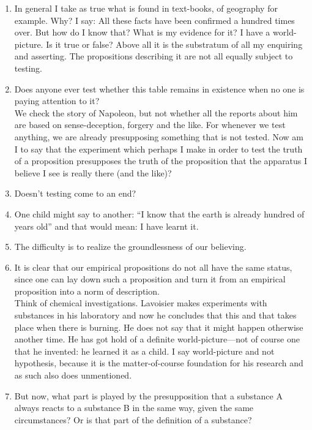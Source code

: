 \documentclass{book}
\begin{document}
\begin{enumerate}
\item
In general I take as true what is found in text-books, of geography for
example. Why? I say: All these facts have been confirmed a hundred times over.
But how do I know that? What is my evidence for it? I have a world-picture. Is
it true or false? Above all it is the substratum of all my enquiring and
asserting. The propositions describing it are not all equally subject to
testing.

\item
Does anyone ever test whether this table remains in existence when no one is
paying attention to it? \\
We check the story of Napoleon, but not whether all the reports about him are
based on sense-deception, forgery and the like. For whenever we test anything,
we are already presupposing something that is not tested. Now am I to say that
the experiment which perhaps I make in order to test the truth of a proposition
presupposes the truth of the proposition that the apparatus I believe I see is
really there (and the like)?

\item
Doesn't testing come to an end?

\item
One child might say to another: ``I know that the earth is already hundred of
years old'' and that would mean: I have learnt it.

\item
The difficulty is to realize the groundlessness of our believing.

\item
It is clear that our empirical propositions do not all have the same status,
since one can lay down such a proposition and turn it from an empirical
proposition into a norm of description. \\
Think of chemical investigations.  Lavoisier makes experiments with substances
in his laboratory and now he concludes that this and that takes place when
there is burning. He does not say that it might happen otherwise another time.
He has got hold of a definite world-picture---not of course one that he
invented: he learned it as a child. I say world-picture and not hypothesis,
because it is the matter-of-course foundation for his research and as such also
does unmentioned.

\item
But now, what part is played by the presupposition that a substance A always
reacts to a substance B in the same way, given the same circumstances? Or is
that part of the definition of a substance?


\end{enumerate}
\end{document}
